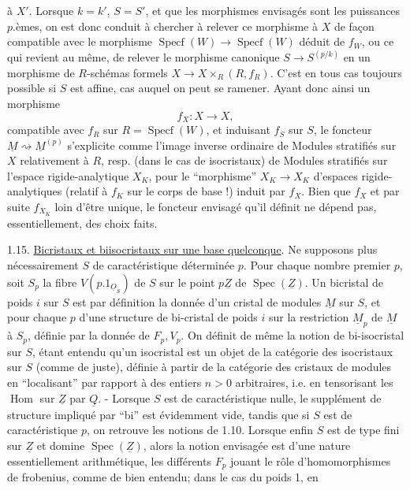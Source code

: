 à $X'$. Lorsque $k=k'$, $S=S'$, et que les morphismes envisagés sont les puissances $p$.èmes, on est donc conduit à chercher à  relever ce morphisme à $X$ de façon compatible avec le morphisme $\operatorname{Specf}(W)\longrightarrow\operatorname{Specf}(W)$ déduit de $f_W$, ou ce qui revient au même, de relever le morphisme canonique $S\longrightarrow S^{(p/k)}$ en un morphisme de $R$-schémas formels $X\longrightarrow X\times_R(R,f_R)$. C'est en tous cas toujours possible si $S$ est affine, cas auquel on peut se ramener. Ayant donc ainsi un morphisme
\[
f_X:X\longrightarrow X,
\]
compatible avec $f_R$ sur $R=\operatorname{Specf}(W)$, et induisant $f_S$ sur $S$, le foncteur $\underline{M}\rightsquigarrow\underline{M}^{(p)}$ s'explicite comme l'image inverse ordinaire de Modules stratifiés sur $X$ relativement à $R$, resp. (dans le cas de isocristaux) de Modules stratifiés sur l'espace rigide-analytique $X_K$, pour le ``morphisme'' $X_K\longrightarrow X_K$ d'espaces rigide-analytiques (relatif à $f_K$ sur le corps de base !) induit par $f_X$. Bien que $f_X$ et par suite $f_{X_K}$  loin d'être unique, le foncteur envisagé qu'il définit ne dépend pas, essentiellement, des choix faits.

1.15. \uline{Bicristaux et biisocristaux sur une base quelconque}. Ne supposons plus nécessairement $S$ de caractéristique déterminée $p$.  Pour chaque nombre premier $p$, soit $S_p$ la fibre $V(p.1_{\underline{O}_S})$ de $S$ sur le point $p\underline{Z}$ de $\operatorname{Spec}(\underline{Z})$. Un bicristal de poids $i$ sur $S$ est par définition la donnée d'un cristal de modules $\underline{M}$ sur $S$, et pour chaque $p$ d'une structure de bi-cristal de poids $i$ sur la restriction $\underline{M}_p$ de $\underline{M}$ à $S_p$, définie par la donnée de $F_p,V_p$. On définit de même la notion de bi-isocristal sur $S$, étant entendu qu'un isocristal est un objet de la catégorie des isocristaux sur $S$ (comme de juste), définie à partir de la catégorie des cristaux de modules en ``localisant'' par rapport à des entiers $n>0$ arbitraires, i.e. en tensorisant les $\operatorname{Hom}$ sur $\underline{Z}$ par $\underline{Q}$. - Lorsque $S$ est de caractéristique nulle, le supplément de structure impliqué par ``bi'' est évidemment vide, tandis que si $S$ est de caractéristique $p$, on retrouve les notions de 1.10. Lorsque enfin $S$ est de type fini sur $\underline{Z}$ et domine $\operatorname{Spec}(\underline{Z})$, alors la notion envisagée est d'une nature essentiellement arithmétique, les différents $F_p$ jouant le rôle d'homomorphismes de frobenius, comme de bien entendu; dans le cas du poids 1, en
